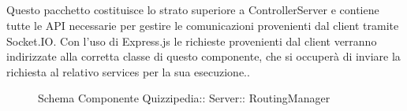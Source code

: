 \subsection{}
Questo pacchetto costituisce lo strato superiore a ControllerServer e contiene tutte le API necessarie per gestire le comunicazioni provenienti dal client tramite Socket.IO. 
Con l'uso di Express.js le richieste provenienti dal client verranno indirizzate alla corretta classe di questo componente, che si occuperà di inviare la richiesta al relativo services per la sua esecuzione..
\begin{figure}[H]
\centering
\noindent{}
\caption[Schema Componente Quizzipedia::Server::RoutingManager]{Schema Componente Quizzipedia:: Server:: RoutingManager}
\end{figure}
